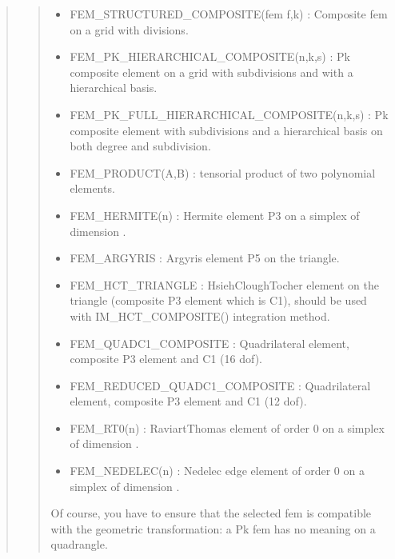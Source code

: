 \documentclass[a4paper,11pt,english]{sphinxmanual}
\begin{document}
\begin{quote}
\begin{quote}
\begin{itemize}
\item {} 
\sphinxAtStartPar
FEM\_STRUCTURED\_COMPOSITE(fem f,k) :
Composite fem  on a grid with  divisions.

\item {} 
\sphinxAtStartPar
FEM\_PK\_HIERARCHICAL\_COMPOSITE(n,k,s) :
Pk composite element on a grid with  subdivisions and with a
hierarchical basis.

\item {} 
\sphinxAtStartPar
FEM\_PK\_FULL\_HIERARCHICAL\_COMPOSITE(n,k,s) :
Pk composite element with  subdivisions and a hierarchical basis
on both degree and subdivision.

\item {} 
\sphinxAtStartPar
FEM\_PRODUCT(A,B) :
tensorial product of two polynomial elements.

\item {} 
\sphinxAtStartPar
FEM\_HERMITE(n) :
Hermite element P3 on a simplex of dimension .

\item {} 
\sphinxAtStartPar
FEM\_ARGYRIS :
Argyris element P5 on the triangle.

\item {} 
\sphinxAtStartPar
FEM\_HCT\_TRIANGLE :
Hsieh\sphinxhyphen{}Clough\sphinxhyphen{}Tocher element on the triangle (composite P3 element
which is C1), should be used with IM\_HCT\_COMPOSITE() integration
method.

\item {} 
\sphinxAtStartPar
FEM\_QUADC1\_COMPOSITE :
Quadrilateral element, composite P3 element and C1 (16 dof).

\item {} 
\sphinxAtStartPar
FEM\_REDUCED\_QUADC1\_COMPOSITE :
Quadrilateral element, composite P3 element and C1 (12 dof).

\item {} 
\sphinxAtStartPar
FEM\_RT0(n) :
Raviart\sphinxhyphen{}Thomas element of order 0 on a simplex of dimension .

\item {} 
\sphinxAtStartPar
FEM\_NEDELEC(n) :
Nedelec edge element of order 0 on a simplex of dimension .

\end{itemize}

\sphinxAtStartPar
Of course, you have to ensure that the selected fem is compatible with
the geometric transformation: a Pk fem has no meaning on a quadrangle.
\end{quote}
\end{quote}
\end{document}
